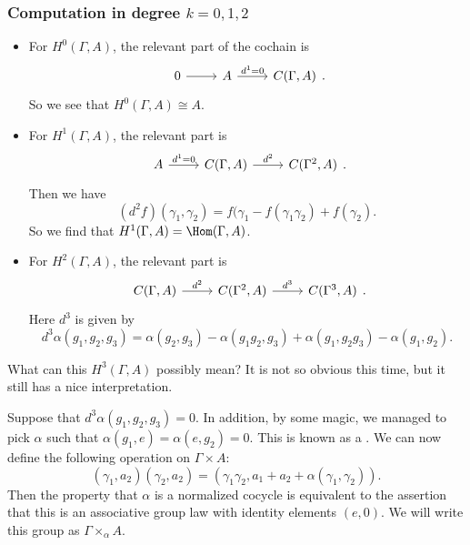 \documentclass[a4paper]{article}
\begin{document}
\subsubsection*{Computation in degree $k = 0, 1, 2$}
\begin{itemize}
  \item For $H^0(\Gamma, A)$, the relevant part of the cochain is
    \[
      \begin{tikzcd}
        0 \ar[r] & A \ar[r, "d^1 = 0"] & C(\Gamma, A)
      \end{tikzcd}.
    \]
    So we see that $H^0(\Gamma, A) \cong A$.

  \item For $H^1(\Gamma, A)$, the relevant part is
    \[
      \begin{tikzcd}
        A \ar[r, "d^1 = 0"] & C(\Gamma, A) \ar[r, "d^2"] & C(\Gamma^2, A)
      \end{tikzcd}.
    \]
    Then we have
    \[
      (d^2 f) (\gamma_1, \gamma_2) = f(\gamma_1 - f(\gamma_1 \gamma_2) + f(\gamma_2).
    \]
    So we find that $H^1(\Gamma, A) = \Hom(\Gamma, A)$.
  \item For $H^2(\Gamma, A)$, the relevant part is
    \[
      \begin{tikzcd}
        C(\Gamma, A) \ar[r, "d^2"] & C(\Gamma^2, A) \ar[r, "d^3"] & C(\Gamma^3, A)
      \end{tikzcd}.
    \]
    Here $d^3$ is given by
    \[
      d^3 \alpha (g_1, g_2, g_3) = \alpha(g_2, g_3) - \alpha(g_1 g_2, g_3) + \alpha(g_1, g_2 g_3) - \alpha(g_1, g_2).
    \]
\end{itemize}
What can this $H^3(\Gamma, A)$ possibly mean? It is not so obvious this time, but it still has a nice interpretation.

Suppose that $d^3 \alpha (g_1, g_2, g_3) = 0$. In addition, by some magic, we managed to pick $\alpha$ such that $\alpha(g_1, e) = \alpha(e, g_2) = 0$. This is known as a . We can now define the following operation on $\Gamma \times A$:
\[
  (\gamma_1, a_2)(\gamma_2, a_2) = (\gamma_1 \gamma_2, a_1 +a _2 + \alpha (\gamma_1, \gamma_2)).
\]
Then the property that $\alpha$ is a normalized cocycle is equivalent to the assertion that this is an associative group law with identity elements $(e, 0)$. We will write this group as $\Gamma \times_\alpha A$.
\end{document}
